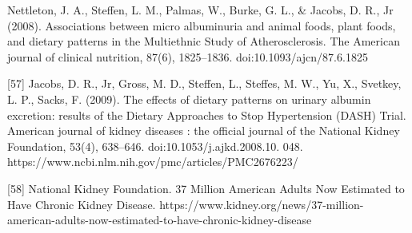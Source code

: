 \begin{flushleft}
[56]  Nettleton, J. A., Steffen, L. M., Palmas, W., Burke, G. L., \& Jacobs, D. R., Jr (2008). Associations between micro albuminuria and animal foods, plant foods, and dietary patterns in the Multiethnic Study of Atherosclerosis. The American journal of clinical nutrition, 87(6), 1825–1836. doi:10.1093/ajcn/87.6.1825

[57] 	Jacobs, D. R., Jr, Gross, M. D., Steffen, L., Steffes, M. W., Yu, X., Svetkey, L. P.,  Sacks, F. (2009). The effects of dietary patterns on urinary albumin excretion: results of the Dietary Approaches to Stop Hypertension (DASH) Trial. American journal of kidney diseases : the official journal of the National Kidney Foundation, 53(4), 638–646. doi:10.1053/j.ajkd.2008.10. 048. https://www.ncbi.nlm.nih.gov/pmc/articles/PMC2676223/

[58] National Kidney Foundation. 37 Million American Adults Now Estimated to Have Chronic Kidney Disease. https://www.kidney.org/news/37-million-american-adults-now-estimated-to-have-chronic-kidney-disease
\end{flushleft}